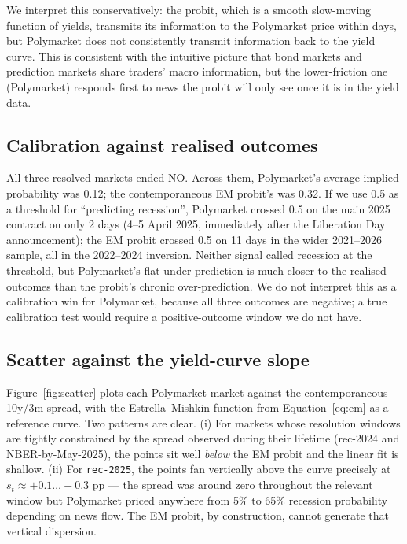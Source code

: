 \documentclass{article}
\begin{document}
We interpret this conservatively: the probit, which is a smooth slow-moving function of yields, transmits its information to the Polymarket price within days, but Polymarket does not consistently transmit information back to the yield curve. This is consistent with the intuitive picture that bond markets and prediction markets share traders' macro information, but the lower-friction one (Polymarket) responds first to news the probit will only see once it is in the yield data.

\subsection{Calibration against realised outcomes}

All three resolved markets ended NO. Across them, Polymarket's average implied probability was \num{0.12}; the contemporaneous EM probit's was \num{0.32}. If we use \num{0.5} as a threshold for ``predicting recession'', Polymarket crossed \num{0.5} on the main 2025 contract on only 2 days (4--5 April 2025, immediately after the Liberation Day announcement); the EM probit crossed \num{0.5} on 11 days in the wider 2021--2026 sample, all in the 2022--2024 inversion. Neither signal called recession at the threshold, but Polymarket's flat under-prediction is much closer to the realised outcomes than the probit's chronic over-prediction. We do not interpret this as a calibration win for Polymarket, because all three outcomes are negative; a true calibration test would require a positive-outcome window we do not have.

\subsection{Scatter against the yield-curve slope}

Figure~\ref{fig:scatter} plots each Polymarket market against the contemporaneous 10y/3m spread, with the Estrella--Mishkin function from Equation~\ref{eq:em} as a reference curve. Two patterns are clear. (i) For markets whose resolution windows are tightly constrained by the spread observed during their lifetime (rec-2024 and NBER-by-May-2025), the points sit well \emph{below} the EM probit and the linear fit is shallow. (ii) For \texttt{rec-2025}, the points fan vertically above the curve precisely at $s_t \approx +0.1\dots+0.3$ pp --- the spread was around zero throughout the relevant window but Polymarket priced anywhere from 5\% to 65\% recession probability depending on news flow. The EM probit, by construction, cannot generate that vertical dispersion.
\end{document}
